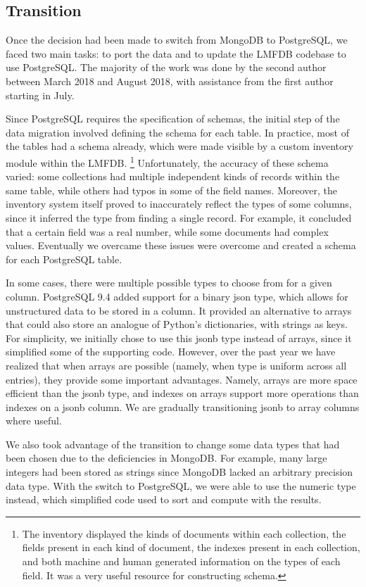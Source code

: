 \documentclass{article}
\begin{document}
\subsection{Transition}

Once the decision had been made to switch from MongoDB to PostgreSQL, we faced two main tasks: to port the data and to update the LMFDB codebase to use PostgreSQL.
The majority of the work was done by the second author between March 2018 and August 2018, with assistance from the first author starting in July.

Since PostgreSQL requires the specification of schemas, the initial step of the data migration involved defining the schema for each table.
In practice, most of the tables had a schema already, which were made visible by a custom inventory module within the LMFDB.%
\footnote{The inventory displayed the kinds of documents within each collection, the fields present in each kind of document, the indexes present in each collection, and both machine and human generated information on the types of each field.
It was a very useful resource for constructing schema.}
Unfortunately, the accuracy of these schema varied: some collections had multiple independent kinds of records within the same table, while others had typos in some of the field names.
Moreover, the inventory system itself proved to inaccurately reflect the types of some columns, since it inferred the type from finding a single record.
For example, it concluded that a certain field was a real number, while some documents had complex values.
Eventually we overcame these issues were overcome and created a schema for each PostgreSQL table.

In some cases, there were multiple possible types to choose from for a given column.
PostgreSQL 9.4 added support for a binary json type, which allows for unstructured data to be stored in a column.
It provided an alternative to arrays that could also store an analogue of Python's dictionaries, with strings as keys.
For simplicity, we initially chose to use this jsonb type instead of arrays, since it simplified some of the supporting code.
However, over the past year we have realized that when arrays are possible (namely, when type is uniform across all entries), they provide some important advantages.
Namely, arrays are more space efficient than the jsonb type, and indexes on arrays support more operations than indexes on a jsonb column.
We are gradually transitioning jsonb to array columns where useful.

We also took advantage of the transition to change some data types that had been chosen due to the deficiencies in MongoDB.
For example, many large integers had been stored as strings since MongoDB lacked an arbitrary precision data type.
With the switch to PostgreSQL, we were able to use the numeric type instead, which simplified code used to sort and compute with the results.
\end{document}
